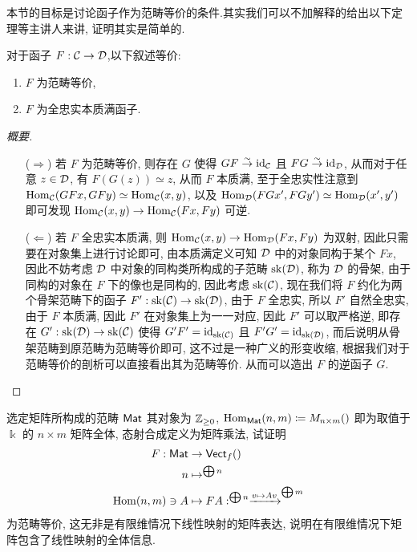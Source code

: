 本节的目标是讨论函子作为范畴等价的条件.其实我们可以不加解释的给出以下定理等主讲人来讲, 证明其实是简单的.
\begin{theorem}
    对于函子 $F : \cal{C} \to \cal{D}$,以下叙述等价:
    \begin{enumerate}
        \item $F$ 为范畴等价,
        \item $F$ 为全忠实本质满函子.
    \end{enumerate}
\end{theorem}
\begin{proof}[概要]
    \begin{enumerate}
        \item[($\Rightarrow$)] 若 $F$ 为范畴等价, 则存在 $G$ 使得 $GF \stackrel{\sim}{\rightarrow} \mathrm{id}_{\cal{C}}$ 且 $FG \stackrel{\sim}{\rightarrow} \mathrm{id}_{\cal{D}}$, 从而对于任意 $z \in \cal{D}$, 有 $F(G(z)) \simeq z$, 从而 $F$ 本质满, 至于全忠实性注意到 $\operatorname{Hom}_{\cal{C}}(GFx,GFy) \simeq \operatorname{Hom}_{\cal{C}}(x,y)$, 以及 $\operatorname{Hom}_{\cal{D}}(FGx',FGy') \simeq \operatorname{Hom}_{\cal{D}}(x',y')$ 即可发现 $\operatorname{Hom}_{\cal{C}}(x,y) \to \operatorname{Hom}_{\cal{C}}(Fx,Fy)$ 可逆.
        \item[($\Leftarrow$)] 若 $F$ 全忠实本质满, 则 $\operatorname{Hom}_{\cal{C}}(x,y)\to \operatorname{Hom}_{\cal{D}}(Fx,Fy)$ 为双射, 因此只需要在对象集上进行讨论即可, 由本质满定义可知 $\cal{D}$ 中的对象同构于某个 $Fx$, 因此不妨考虑 $\cal{D}$ 中对象的同构类所构成的子范畴 $\operatorname{sk}(\cal{D})$, 称为 $\cal{D}$ 的骨架, 由于同构的对象在 $F$ 下的像也是同构的, 因此考虑 $\operatorname{sk}(\cal{C})$, 现在我们将 $F$ 约化为两个骨架范畴下的函子 $F': \operatorname{sk}(\cal{C})\to \operatorname{sk}(\cal{D})$, 由于 $F$ 全忠实, 所以 $F'$ 自然全忠实, 由于 $F$ 本质满, 因此 $F'$ 在对象集上为一一对应, 因此 $F'$ 可以取严格逆, 即存在 $G' : \operatorname{sk}(\cal{D})\to \operatorname{sk}(\cal{C})$ 使得 $G'F' = \mathrm{id}_{\operatorname{sk}(\cal{C})}$ 且 $F'G' = \mathrm{id}_{\operatorname{sk}(\cal{D})}$, 而后说明从骨架范畴到原范畴为范畴等价即可, 这不过是一种广义的形变收缩, 根据我们对于范畴等价的剖析可以直接看出其为范畴等价. 从而可以造出 $F$ 的逆函子 $G$.
    \end{enumerate}
\end{proof}
\begin{exercise}\label{练习:矩阵表示}
    选定矩阵所构成的范畴 $\mathsf{Mat}$ 其对象为 $\mathbb{Z}_{\geq 0}$, $\operatorname{Hom}_{\mathsf{Mat}}(n,m) \coloneqq M_{n\times m}(\relax)$ 即为取值于 $\Bbbk$ 的 $n \times m$ 矩阵全体, 态射合成定义为矩阵乘法, 试证明 
    \begin{align*}
        F: \mathsf{Mat} &\to \mathsf{Vect}_f(\relax)\\
        n &\mapsto \relax^{\bigoplus n}\\
        \operatorname{Hom}(n,m)\ni A &\mapsto FA: \relax^{\bigoplus n}\xrightarrow{v \mapsto Av} \relax^{\bigoplus m}
    \end{align*}
    为范畴等价, 这无非是有限维情况下线性映射的矩阵表达, 说明在有限维情况下矩阵包含了线性映射的全体信息.
\end{exercise}
